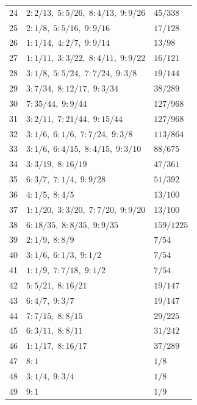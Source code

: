 \begin{longtable}{rll}
24 & $2:2/13,\; 5:5/26,\; 8:4/13,\; 9:9/26$ & $45/338$\\
25 & $2:1/8,\; 5:5/16,\; 9:9/16$ & $17/128$\\
26 & $1:1/14,\; 4:2/7,\; 9:9/14$ & $13/98$\\
27 & $1:1/11,\; 3:3/22,\; 8:4/11,\; 9:9/22$ & $16/121$\\
28 & $3:1/8,\; 5:5/24,\; 7:7/24,\; 9:3/8$ & $19/144$\\
29 & $3:7/34,\; 8:12/17,\; 9:3/34$ & $38/289$\\
30 & $7:35/44,\; 9:9/44$ & $127/968$\\
31 & $3:2/11,\; 7:21/44,\; 9:15/44$ & $127/968$\\
32 & $3:1/6,\; 6:1/6,\; 7:7/24,\; 9:3/8$ & $113/864$\\
33 & $3:1/6,\; 6:4/15,\; 8:4/15,\; 9:3/10$ & $88/675$\\
34 & $3:3/19,\; 8:16/19$ & $47/361$\\
35 & $6:3/7,\; 7:1/4,\; 9:9/28$ & $51/392$\\
36 & $4:1/5,\; 8:4/5$ & $13/100$\\
37 & $1:1/20,\; 3:3/20,\; 7:7/20,\; 9:9/20$ & $13/100$\\
38 & $6:18/35,\; 8:8/35,\; 9:9/35$ & $159/1225$\\
39 & $2:1/9,\; 8:8/9$ & $7/54$\\
40 & $3:1/6,\; 6:1/3,\; 9:1/2$ & $7/54$\\
41 & $1:1/9,\; 7:7/18,\; 9:1/2$ & $7/54$\\
42 & $5:5/21,\; 8:16/21$ & $19/147$\\
43 & $6:4/7,\; 9:3/7$ & $19/147$\\
44 & $7:7/15,\; 8:8/15$ & $29/225$\\
45 & $6:3/11,\; 8:8/11$ & $31/242$\\
46 & $1:1/17,\; 8:16/17$ & $37/289$\\
47 & $8:1$ & $1/8$\\
48 & $3:1/4,\; 9:3/4$ & $1/8$\\
49 & $9:1$ & $1/9$\\
\end{longtable}
\endgroup
